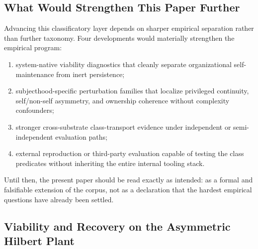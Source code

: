 \documentclass[11pt,a4paper]{article}
\theoremstyle{definition}
\begin{document}
\subsection{What Would Strengthen This Paper Further}
Advancing this classificatory layer depends on sharper empirical separation rather than further taxonomy. Four developments would materially strengthen the empirical program:
\begin{enumerate}[leftmargin=1.5em]
\item system-native viability diagnostics that cleanly separate organizational self-maintenance from inert persistence;
\item subjecthood-specific perturbation families that localize privileged continuity, self/non-self asymmetry, and ownership coherence without complexity confounders;
\item stronger cross-substrate class-transport evidence under independent or semi-independent evaluation paths;
\item external reproduction or third-party evaluation capable of testing the class predicates without inheriting the entire internal tooling stack.
\end{enumerate}
Until then, the present paper should be read exactly as intended: as a formal and falsifiable extension of the corpus, not as a declaration that the hardest empirical questions have already been settled.

\subsection{Viability and Recovery on the Asymmetric Hilbert Plant}
\end{document}
